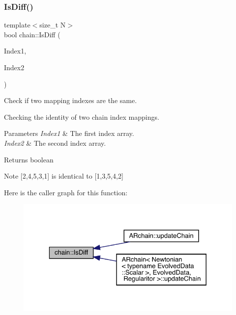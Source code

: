 \subsubsection{\texorpdfstring{Is\+Diff()}{IsDiff()}}
{\footnotesize\ttfamily template$<$size\+\_\+t N$>$ \\
bool chain\+::\+Is\+Diff (\begin{DoxyParamCaption}\item[{const \mbox{\hyperlink{namespacechain_aa40d2da395c0ac2bc5f37832442ac403}{Index\+Array}}$<$ N $>$ \&}]{Index1,  }\item[{const \mbox{\hyperlink{namespacechain_aa40d2da395c0ac2bc5f37832442ac403}{Index\+Array}}$<$ N $>$ \&}]{Index2 }\end{DoxyParamCaption})}



Check if two mapping indexes are the same. 

Checking the identity of two chain index mappings. 
\begin{DoxyParams}{Parameters}
{\em Index1} & The first index array. \\
\hline
{\em Index2} & The second index array. \\
\hline
\end{DoxyParams}
\begin{DoxyReturn}{Returns}
boolean 
\end{DoxyReturn}
\begin{DoxyNote}{Note}
\mbox{[}2,4,5,3,1\mbox{]} is identical to \mbox{[}1,3,5,4,2\mbox{]} 
\end{DoxyNote}
Here is the caller graph for this function\+:
\nopagebreak
\begin{figure}[H]
\begin{center}
\leavevmode
\includegraphics[width=323pt]{namespacechain_a874f28a6248b56c6b2b3ca45c1bbea09_icgraph}
\end{center}
\end{figure}
\mbox{\label{namespacechain_ae85619534182ce257fc47857a9c133e4}} 

